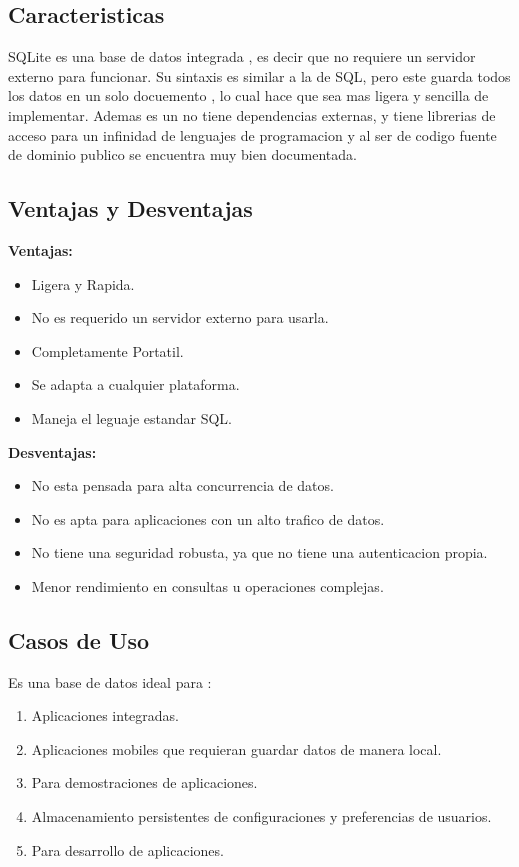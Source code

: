 \documentclass[12pt]{article}
\begin{document}
\vspace{1cm}
\subsection{Caracteristicas}

SQLite es una base de datos integrada , es decir que no requiere un servidor externo para funcionar. Su sintaxis es similar a la de SQL, pero este guarda todos los datos en un solo docuemento , lo cual hace que sea mas ligera y sencilla de implementar.
Ademas es un no tiene dependencias externas, y tiene librerias de acceso para un infinidad de lenguajes de programacion y al ser de codigo fuente de dominio publico se encuentra muy bien documentada.


\vspace{1cm}
\subsection{Ventajas y Desventajas}

\textbf{Ventajas:}
\begin{itemize}
    \item Ligera y Rapida.
    \item No es requerido un servidor externo para usarla.
    \item Completamente Portatil.
    \item Se adapta a cualquier plataforma.
    \item Maneja el leguaje estandar SQL. 
\end{itemize}
\vspace{0.5cm}
\textbf{Desventajas:}
\begin{itemize}
    \item No esta pensada para alta concurrencia de datos.
    \item No es apta para aplicaciones con un alto trafico de datos.
    \item No tiene una seguridad robusta, ya que no tiene una autenticacion propia.
    \item Menor rendimiento en consultas u operaciones complejas.
\end{itemize}

\vspace{0.7cm}
\subsection{Casos de Uso}

Es una base de datos ideal para :
\begin{enumerate}
    \item Aplicaciones integradas.
    \item Aplicaciones mobiles que requieran guardar datos de manera local.
    \item Para demostraciones de aplicaciones.
    \item Almacenamiento persistentes de configuraciones y preferencias de usuarios.
    \item Para desarrollo de aplicaciones.
\end{enumerate}
\end{document}
